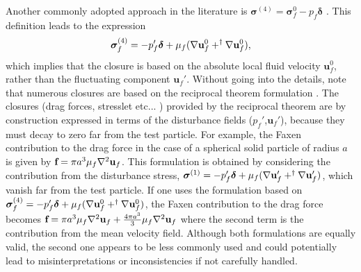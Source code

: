 Another commonly adopted approach in the literature is $\bm \sigma ^{(4)} = \bm \sigma _f ^0 - p_f\bm\delta$ \citep{simonin1996,lhuillier2009rheology,morel2015mathematical,guazzelli2018rheology}.
This definition leads to the expression
\begin{equation}
    \bm\sigma_f^{(4)}  = -p_f' \bm\delta + \mu_f (\mathbf{\nabla} \textbf{u}_f^0 + ^\dagger \mathbf{\nabla} \textbf{u}_f^0),
\end{equation}
which implies that the closure is based on the absolute local fluid velocity $\textbf{u}_f^0$, rather than the fluctuating component $\textbf{u}_f'$.
Without going into the details, note that numerous closures are based on the reciprocal theorem formulation \citep{kim2013microhydrodynamics,stone2001inertial,raja2010inertial}. %
The closures (drag forces, stresslet etc... ) provided by the reciprocal theorem are by construction expressed in terms of the disturbance fields ($p_f'$,$\textbf{u}_f'$), because they must decay to zero far from the test particle. 
For example, the Faxen contribution to the drag force in the case of a spherical solid particle of radius $a$ is given by $\textbf{f} = \pi a^3 \mu_f \mathbf{\nabla}^2 \textbf{u}_f$. 
This formulation is obtained  by considering the contribution from the disturbance stress, $\bm\sigma ^{(1)}  = -p_f' \bm\delta + \mu_f (\mathbf{\nabla} \textbf{u}_f' + ^\dagger \mathbf{\nabla} \textbf{u}_f')$, which vanish far from the test particle. 
If one uses the formulation based on $\bm\sigma_f^{(4)}  = -p_f' \bm\delta + \mu_f (\mathbf{\nabla} \textbf{u}_f^0 + ^\dagger \mathbf{\nabla} \textbf{u}_f^0)$, the Faxen contribution to the drag force becomes $\textbf{f} = \pi a^3 \mu_f \mathbf{\nabla}^2 \textbf{u}_f + \frac{4\pi a^3}{3}\mu_f \mathbf{\nabla}^2 \textbf{u}_f$ where the second term is the contribution from the mean velocity field.
Although both formulations are equally valid, the second one appears to be less commonly used and could potentially lead to misinterpretations or inconsistencies if not carefully handled. 



